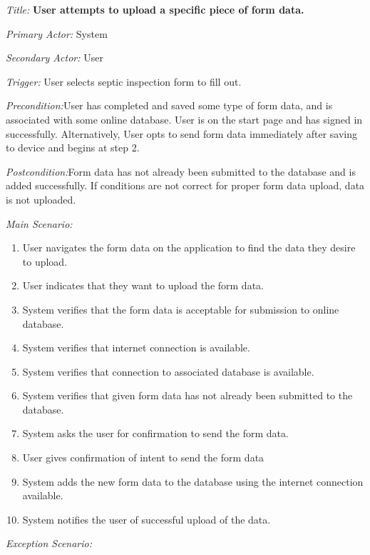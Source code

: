 \documentclass[twoside,letterpaper]{article}
\begin{document}
\textit{Title: }{\bfseries\color{black}User attempts to upload a specific piece of form data.}

{\color{black} \textit{Primary Actor:} System}

{\color{black} \textit{Secondary Actor:} User}

{\color{black} \textit{Trigger:} User selects septic inspection form to fill out.}

{\color{black} \textit{Precondition:}User has completed and saved some type of form data, and is associated with some online database. User is on the start page and has signed in successfully. Alternatively, User opts to send form data immediately after saving to device and begins at step 2.}

{\color{black} \textit{Postcondition:}Form data has not already been submitted to the database and is added successfully. If conditions are not correct for proper form data upload, data is not uploaded.}
\newline

{\color{black} \textit{Main Scenario:}}
\begin{enumerate}
\item User navigates the form data on the application to find the data they desire to upload.
\item User indicates that they want to upload the form data.
\item System verifies that the form data is acceptable for submission to online database.
\item System verifies that internet connection is available.
\item System verifies that connection to associated database is available.
\item System verifies that given form data has not already been submitted to the database.
\item System asks the user for confirmation to send the form data.
\item User gives confirmation of intent to send the form data
\item System adds the new form data to the database using the internet connection available.
\item System notifies the user of successful upload of the data.
\end{enumerate}

{\color{black} \textit{Exception Scenario:}}
\end{document}

